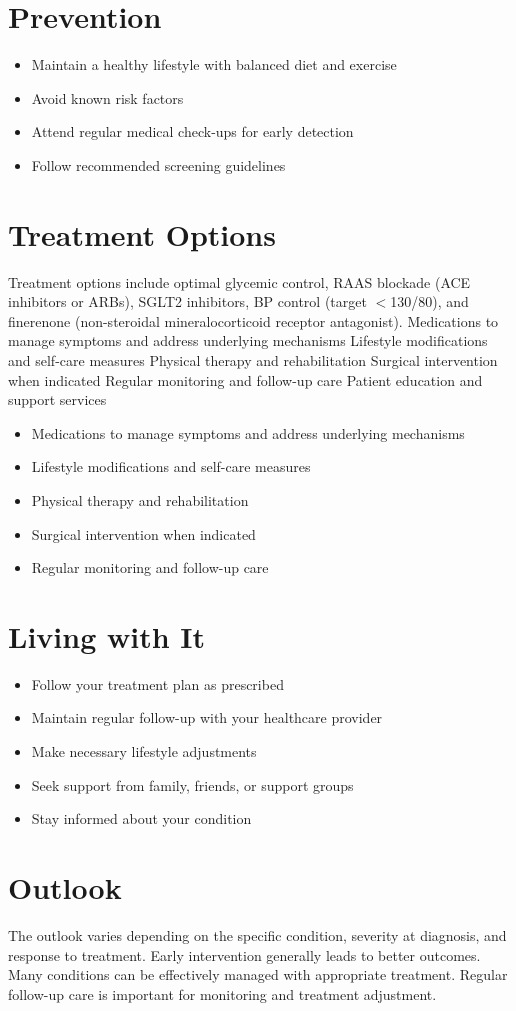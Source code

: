\section{Prevention}
\begin{itemize}[noitemsep]
  \item Maintain a healthy lifestyle with balanced diet and exercise
  \item Avoid known risk factors
  \item Attend regular medical check-ups for early detection
  \item Follow recommended screening guidelines
\end{itemize}
\section{Treatment Options}
Treatment options include optimal glycemic control, RAAS blockade (ACE inhibitors or ARBs), SGLT2 inhibitors, BP control (target $<$130/80), and finerenone (non-steroidal mineralocorticoid receptor antagonist). Medications to manage symptoms and address underlying mechanisms Lifestyle modifications and self-care measures Physical therapy and rehabilitation Surgical intervention when indicated Regular monitoring and follow-up care Patient education and support services

\begin{itemize}[noitemsep]
  \item Medications to manage symptoms and address underlying mechanisms
  \item Lifestyle modifications and self-care measures
  \item Physical therapy and rehabilitation
  \item Surgical intervention when indicated
  \item Regular monitoring and follow-up care
\end{itemize}
\section{Living with It}
\begin{itemize}[noitemsep]
  \item Follow your treatment plan as prescribed
  \item Maintain regular follow-up with your healthcare provider
  \item Make necessary lifestyle adjustments
  \item Seek support from family, friends, or support groups
  \item Stay informed about your condition
\end{itemize}
\section{Outlook}
The outlook varies depending on the specific condition, severity at diagnosis, and response to treatment. Early intervention generally leads to better outcomes. Many conditions can be effectively managed with appropriate treatment. Regular follow-up care is important for monitoring and treatment adjustment.
